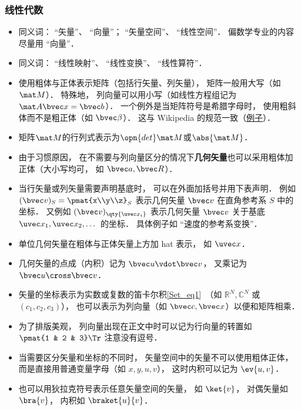 \subsubsection{线性代数}
\begin{itemize}
\item 同义词： “矢量”、 “向量”； “矢量空间”、 “线性空间”． 偏数学专业的内容尽量用 “向量”．
\item 同义词： “线性映射”、 “线性变换”、 “线性算符”．
\item 使用粗体与正体表示矩阵（包括行矢量、列矢量）， 矩阵一般用大写（如 $\mat M$）． 特殊地， 列向量可以用小写（如线性方程组记为 $\mat A \bvec x = \bvec b$）． 一个例外是当矩阵符号是希腊字母时， 使用粗斜体而不是粗正体（如 $\bvec \beta$）． 这与 Wikipedia 的规范一致（\href{https://en.wikipedia.org/wiki/Angular_acceleration}{例子}）．
\item 矩阵$\mat M$的行列式表示为$\opn{det}\mat M$或$\abs{\mat M}$．
\item 由于习惯原因， 在不需要与列向量区分的情况下\textbf{几何矢量}也可以采用粗体加正体（大小写均可， 如 $\bvec a, \bvec R$）．
\item 当行矢量或列矢量需要声明基底时， 可以在外面加括号并用下表声明． 例如 $(\bvec v)_S = \pmat{x\\y\\z}_S$ 表示几何矢量 $\bvec v$ 在直角参考系 $S$ 中的坐标． 又例如 $(\bvec v)_{\qty{\uvec x_i}}$ 表示几何矢量 $\bvec v$ 关于基底 $\uvec x_1, \uvec x_2, \dots$ 的坐标． 具体例子如 “速度的参考系变换”．
\item 单位几何矢量在粗体与正体矢量上方加 hat 表示， 如 $\uvec x$．
\item 几何矢量的点成（内积）记为 $\bvec u \vdot \bvec v$， 叉乘记为 $\bvec u \cross \bvec v$．
\item 矢量的坐标表示为实数或复数的笛卡尔积\autoref{Set_eq1}~（如 $\mathbb R^N, \mathbb C^N$ 或 $(c_1, c_2, c_3)$）， 也可以表示为列向量（如 $\bvec c, \bvec x$）以便和矩阵相乘．
\item 为了排版美观， 列向量出现在正文中时可以记为行向量的转置如 $\pmat{1 & 2 & 3}\Tr$ 注意没有逗号．
\item 当需要区分矢量和坐标的不同时， 矢量空间中的矢量不可以使用粗体正体， 而是直接用普通变量字母（如 $x, y, u, v$）， 这时内积可以记为 $\ev{u, v}$．
\item 也可以用狄拉克符号表示任意矢量空间的矢量， 如 $\ket{v}$， 对偶矢量如 $\bra{v}$， 内积如 $\braket{u}{v}$．
\end{itemize}

